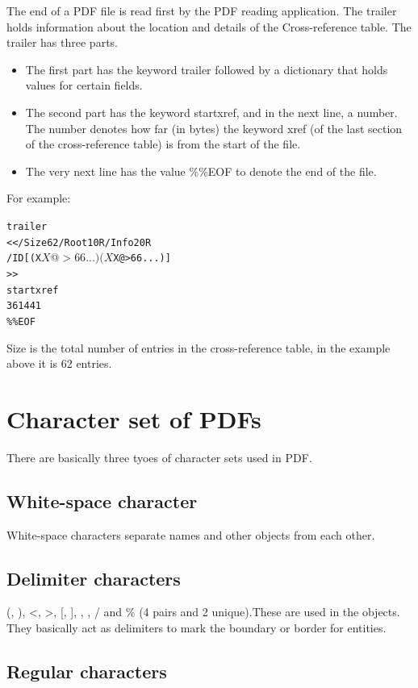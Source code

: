 The end of a PDF file is read first by the PDF reading application. The trailer holds information about the location and details of the Cross-reference table. The trailer has three parts.

\begin{itemize}
	\item The first part has the keyword trailer followed by a dictionary that holds values for certain fields.
	\item The second part has the keyword startxref, and in the next line, a number. The number denotes how far (in bytes) the keyword xref (of the last section of the cross-reference table) is from the start of the file.
	\item The very next line has the value \%\%EOF to denote the end of the file.
\end{itemize}
For example:

\begin{alltt}
	trailer
	<< /Size 62 /Root 1 0 R /Info 2 0 R
	/ID [(X$X@>66...)(X$X@>66...)]
	>>
	startxref
	361441
	\%\%EOF
\end{alltt}

Size is the total number of entries in the cross-reference table, in the example above it is 62 entries.

\section{Character set of PDFs}

There are basically three tyoes of character sets used in PDF.

\subsection{White-space character}

White-space characters separate names and other objects from each other.

\subsection{Delimiter characters}

(, ), <, >, [, ], {, }, / and \% (4 pairs and 2 unique).These are used in the objects. They basically act as delimiters to mark the boundary or border for entities.

\subsection{Regular characters}

